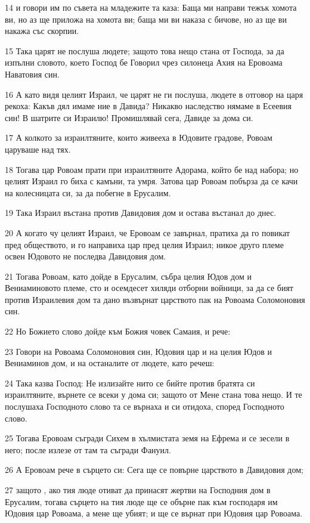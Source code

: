 \par 14 и говори им по съвета на младежите та каза: Баща ми направи тежък хомота ви, но аз ще приложа на хомота ви; баща ми ви наказа с бичове, но аз ще ви накажа със скорпии.
\par 15 Така царят не послуша людете; защото това нещо стана от Господа, за да изпълни словото, което Господ бе Говорил чрез силонеца Ахия на Еровоама Наватовия син.
\par 16 А като видя целият Израил, че царят не ги послуша, людете в отговор на царя рекоха: Какъв дял имаме ние в Давида? Никакво наследство нямаме в Есеевия син! В шатрите си Израилю! Промишлявай сега, Давиде за дома си.
\par 17 А колкото за израилтяните, които живееха в Юдовите градове, Ровоам царуваше над тях.
\par 18 Тогава цар Ровоам прати при израилтяните Адорама, който бе над набора; но целият Израил го биха с камъни, та умря. Затова цар Ровоам побърза да се качи на колесницата си, за да побегне в Ерусалим.
\par 19 Така Израил въстана против Давидовия дом и остава въстанал до днес.
\par 20 А когато чу целият Израил, че Еровоам се завърнал, пратиха да го повикат пред обществото, и го направиха цар пред целия Израил; никое друго племе освен Юдовото не последва Давидовия дом.
\par 21 Тогава Ровоам, като дойде в Ерусалим, събра целия Юдов дом и Вениаминовото племе, сто и осемдесет хиляди отборни войници, за да се бият против Израилевия дом та дано възвърнат царството пак на Ровоама Соломоновия син.
\par 22 Но Божието слово дойде към Божия човек Самаия, и рече:
\par 23 Говори на Ровоама Соломоновия син, Юдовия цар и на целия Юдов и Вениаминов дом, и на останалите от людете, като речеш:
\par 24 Така казва Господ: Не излизайте нито се бийте против братята си израилтяните, върнете се всеки у дома си; защото от Мене стана това нещо. И те послушаха Господното слово та се върнаха и си отидоха, според Господното слово.
\par 25 Тогава Еровоам съгради Сихем в хълмистата земя на Ефрема и се зесели в него; после излезе от там та съгради Фануил.
\par 26 А Еровоам рече в сърцето си: Сега ще се повърне царството в Давидовия дом;
\par 27 защото , ако тия люде отиват да принасят жертви на Господния дом в Ерусалим, тогава сърцето на тия люде ще се обърне пак към господаря им Юдовия цар Ровоама, а мене ще убият; и ще се върнат при Юдовия цар Ровоама.
